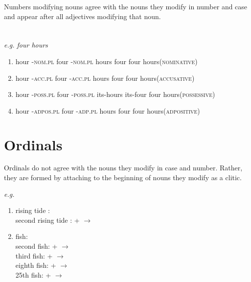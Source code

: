 \documentclass[11pt]{report}
\newcommand{\h}{{$^h$}}
\newcommand{\R}{{\*r}}
\begin{document}
Numbers modifying nouns agree with the nouns they modify in number and case and appear after all adjectives modifying that noun.\\
\\
\\
\textit{e.g. four hours}
\begin{enumerate}
	\item
	{hour -\textsc{nom.pl} four -\textsc{nom.pl}}
	{hours {} four {} }
	{four hours(\textsc{nominative})}
	\item
		\trigloss[preamble={\textipa{xEn\R{} NeZ\R{}}  }]
	{\textipa{xEn} -\textipa{\R{}} \textipa{NeZ} -\textipa{\R{}} }
	{hour -\textsc{acc.pl} four -\textsc{acc.pl}}
	{hours {} four {}}
	{four hours(\textsc{accusative})}
	\item
	{hour -\textsc{poss.pl} four -\textsc{poss.pl}}
	{its-hours {} its-four {}}
	{four hours(\textsc{possessive})}
	\item 
	{hour -\textsc{adpos.pl} four -\textsc{adp.pl}}
	{hours {} four {} }
	{four hours(\textsc{adpositive})}
\end{enumerate}

\section{Ordinals}
Ordinals do not agree with the nouns they modify in case and number.  Rather, they are formed by attaching to the beginning of nouns they modify as a clitic.

\textit{e.g.} 
\begin{enumerate}
	\item
{rising tide :  \\
second rising tide : \textipa{ak\h} +  $\rightarrow$  }

\item
	{fish:  \\
second fish: \textipa{ak\h} +  $\rightarrow$  \\
third fish:  +  $\rightarrow$  \\
eighth fish:  +  $\rightarrow$  \\
25th fish:  +  $\rightarrow$    }
\end{enumerate}
\end{document}
